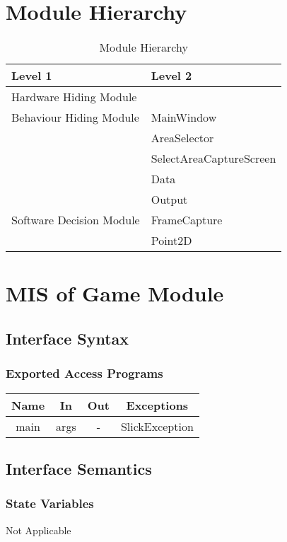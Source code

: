 \documentclass[12,english]{article}
\begin{document}
\section{Module Hierarchy}
\begin{table}[!htbp]
        \begin{tabular}{ll}
        \toprule
        Level 1 & Level 2 \\
        \midrule
        Hardware Hiding Module & \\
        \midrule
        Behaviour Hiding Module 
        & MainWindow\\
        & AreaSelector\\
        & SelectAreaCaptureScreen\\
        & Data\\ 
		& Output\\
		\midrule
        Software Decision Module 
        &FrameCapture\\
        &Point2D\\
        \bottomrule
        \end{tabular}
        \caption{Module Hierarchy}
        \end{table}

\section{MIS of Game Module}
		\subsection{Interface Syntax}
		\subsubsection{Exported Access Programs}
		\begin{tabular}[pos]{|c|c|c|c|}
			
			\hline
			\textbf{Name}& \textbf{In} & \textbf{Out} & \textbf{Exceptions} \\ \hline
			main & args & - & SlickException\\ \hline
			
		\end{tabular}
		
		\subsection{Interface Semantics}
		\subsubsection{State Variables}
		Not Applicable
		
\end{document}
